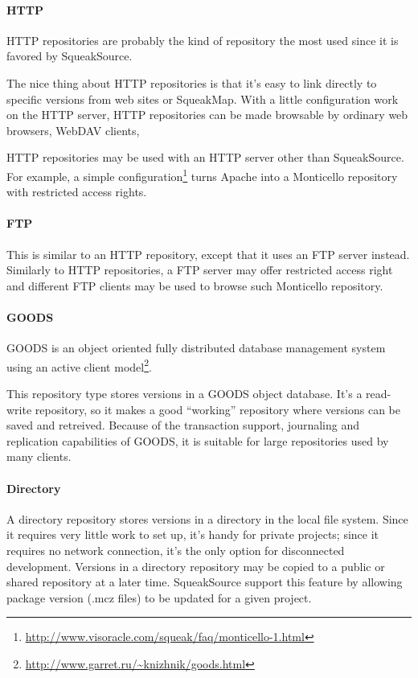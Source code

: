 \documentclass[a4paper,10pt,twoside]{book}
\begin{document}
\paragraph{HTTP} HTTP repositories are probably the kind of repository the most used since it is favored by SqueakSource. %

The nice thing about HTTP repositories is that it's easy to link directly to specific versions from web sites or SqueakMap. With a little configuration work on the HTTP server, HTTP repositories can be made browsable by ordinary web browsers, WebDAV clients, \etc 

HTTP repositories may be used with an HTTP server other than SqueakSource. For example, a simple configuration\footnote{\url{http://www.visoracle.com/squeak/faq/monticello-1.html}} turns Apache into a Monticello repository with restricted access rights.



\paragraph{FTP} This is similar to an HTTP repository, except that it uses an FTP server instead. Similarly to HTTP repositories, a FTP server may offer restricted access right and different FTP clients may be used to browse such Monticello repository.

\paragraph{GOODS} GOODS is an object oriented fully distributed database management system using an active client model\footnote{\url{http://www.garret.ru/~knizhnik/goods.html}}.

This repository type stores versions in a GOODS object database. It's a read-write repository, so it makes a good ``working'' repository where versions can be saved and retreived. Because of the transaction support, journaling and replication capabilities of GOODS, it is suitable for large repositories used by many clients.  

\paragraph{Directory} A directory repository stores versions in a directory in the local file system. Since it requires very little work to set up, it's handy for private projects; since it requires no network connection, it's the only option for disconnected development. Versions in a directory repository may be copied to a public or shared repository at a later time. SqueakSource support this feature by allowing package version (.mcz files) to be updated for a given project. 
\end{document}
